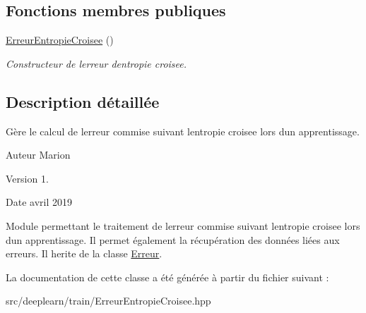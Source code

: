 \subsection*{Fonctions membres publiques}
\begin{DoxyCompactItemize}
\item 
\mbox{\label{classErreurEntropieCroisee_ae79638c0e11e44100663e83f07273542}} 
\hyperlink{classErreurEntropieCroisee_ae79638c0e11e44100663e83f07273542}{Erreur\+Entropie\+Croisee} ()
\begin{DoxyCompactList}\small\item\em Constructeur de l\textquotesingle{}erreur d\textquotesingle{}entropie croisee. \end{DoxyCompactList}\end{DoxyCompactItemize}


\subsection{Description détaillée}
Gère le calcul de l\textquotesingle{}erreur commise suivant l\textquotesingle{}entropie croisee lors d\textquotesingle{}un apprentissage. 

\begin{DoxyAuthor}{Auteur}
Marion 
\end{DoxyAuthor}
\begin{DoxyVersion}{Version}
1. 
\end{DoxyVersion}
\begin{DoxyDate}{Date}
avril 2019
\end{DoxyDate}
Module permettant le traitement de l\textquotesingle{}erreur commise suivant l\textquotesingle{}entropie croisee lors d\textquotesingle{}un apprentissage. Il permet également la récupération des données liées aux erreurs. Il herite de la classe \hyperlink{classErreur}{Erreur}. 

La documentation de cette classe a été générée à partir du fichier suivant \+:\begin{DoxyCompactItemize}
\item 
src/deeplearn/train/Erreur\+Entropie\+Croisee.\+hpp\end{DoxyCompactItemize}
